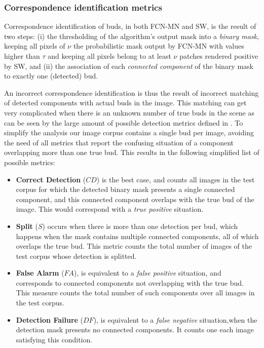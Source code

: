 \documentclass[a4paper,authoryear,review]{elsarticle}
\begin{document}
\subsubsection{Correspondence identification metrics } \label{subsec:detectmetrics}

Correspondence identification of buds, in both FCN-MN and SW, is the result of two steps: (i)  the thresholding of the algorithm’s output mask into a \emph{binary mask}, keeping all pixels of $\nu$ the probabilistic mask output by FCN-MN with values higher than $\tau$ and keeping all pixels belong to at least $\nu$ patches rendered positive by SW, and (ii) the association of each \emph{connected component} of the binary mask to exactly one (detected) bud. 

%
An incorrect correspondence identification is thus the result of incorrect matching of detected components with actual buds in the image. This matching can get very complicated when there is an unknown number of true buds in the scene as can be seen by the large amount of possible detection metrics defined in \cite{oguz2017dice}. To simplify the analysis our image corpus contains a single bud per image, avoiding the need of all metrics that report the confusing situation of a component overlapping more than one true bud. This results in the following simplified list of possible metrics:

\begin{itemize}
\item \textbf{Correct Detection} ($CD$) is the best case, and counts all images in the test corpus for which the detected binary mask presents a single connected component, and this connected component overlaps with the true bud of the image. This would correspond with a \emph{true positive} situation.
\item \textbf{Split} ($S$) occurs when there is more than one detection per bud, which happens  when the mask contains multiple connected components, all of which overlaps the true bud. This metric counts the total number of images of the test corpus whose detection is splitted.
\item \textbf{False Alarm} ($FA$), is equivalent to a \emph{false positive} situation, and corresponds to connected components not overlapping with the true bud. This measure counts the total number of such components over all images in the test corpus.
\item \textbf{Detection Failure} ($DF$), is equivalent to a \emph{false negative} situation,when the detection mask presents no connected components. It counts one each image satisfying this condition.
\end{itemize}
\end{document}

